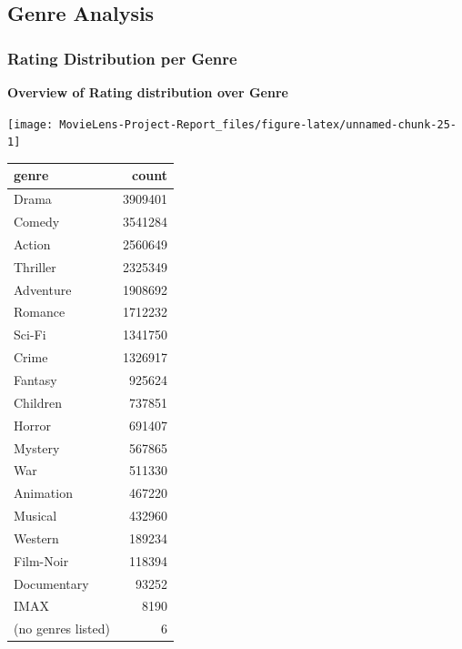 \documentclass[
]{article}
\begin{document}
\hypertarget{genre-analysis}{%
\subsection{Genre Analysis}\label{genre-analysis}}

\hypertarget{rating-distribution-per-genre}{%
\subsubsection{Rating Distribution per
Genre}\label{rating-distribution-per-genre}}

\textbf{Overview of Rating distribution over Genre}

\begin{center}\texttt{[image: MovieLens-Project-Report\_files/figure-latex/unnamed-chunk-25-1]} \end{center}

\begin{table}[!h]
\centering\begingroup\fontsize{10}{12}\selectfont

\begin{tabular}{l|r}
\hline
genre & count\\
\hline
Drama & 3909401\\
\hline
Comedy & 3541284\\
\hline
Action & 2560649\\
\hline
Thriller & 2325349\\
\hline
Adventure & 1908692\\
\hline
Romance & 1712232\\
\hline
Sci-Fi & 1341750\\
\hline
Crime & 1326917\\
\hline
Fantasy & 925624\\
\hline
Children & 737851\\
\hline
Horror & 691407\\
\hline
Mystery & 567865\\
\hline
War & 511330\\
\hline
Animation & 467220\\
\hline
Musical & 432960\\
\hline
Western & 189234\\
\hline
Film-Noir & 118394\\
\hline
Documentary & 93252\\
\hline
IMAX & 8190\\
\hline
(no genres listed) & 6\\
\hline
\end{tabular}
\endgroup{}
\end{table}
\end{document}
